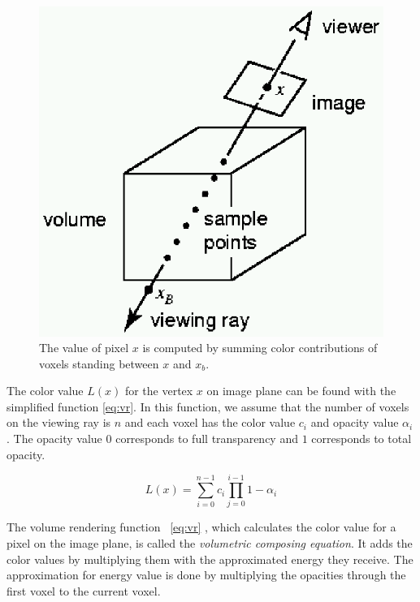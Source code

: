 \documentclass[a4paper,12pt]{article}
\begin{document}
\begin{figure}[ht!]     
\begin{center}  
  \includegraphics{simplevolumevis.eps}
\caption{The value of pixel $x$ is computed by summing color contributions
  of voxels standing between $x$ and $x_{b}$.}
\label{svv}
\end{center}
\end{figure}

The color value $L(x)$ for the vertex $x$ on image plane can be found
with the simplified function \ref{eq:vr}. In this function, we
assume that the number of voxels on the viewing ray is $n$ and each
voxel has the color value $c_{i}$ and opacity value $\alpha_{i}$. The
opacity value $0$ corresponds to full transparency and $1$ corresponds
to total opacity.

\begin{equation} 
\label{eq:vr} 
L(x) = \sum_{i=0}^{n-1} c_{i} \prod_{j=0}^{i-1} 1-\alpha_{i}
\end{equation}
 
The volume rendering function ~\ref{eq:vr} , which calculates the
color value for a pixel on the image plane, is called the
\emph{volumetric composing equation}. It adds the color values by
multiplying them with the approximated energy they receive. The
approximation for energy value is done by multiplying the opacities
through the first voxel to the current voxel.
\end{document}

